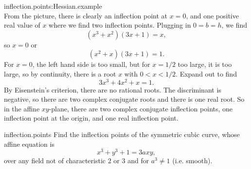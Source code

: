 \begin{answer}{inflection.points:Hessian.example}
\[\]
From the picture, there is clearly an inflection point at \(x=0\), and one positive real value of \(x\) where we find two inflection points.
Plugging in \(0=b=h\), we find 
\[
(x^3+x^2)(3x+1)=x,
\]
so \(x=0\) or 
\[
(x^2+x)(3x+1)=1.
\]
For \(x=0\), the left hand side is too small, but for \(x=1/2\) too large, it is too large, so by continuity, there is a root \(x\) with \(0<x<1/2\).
Expand out to find
\[
3x^3+4x^2+x=1.
\]
By Eisenstein's criterion, there are no rational roots.
The discriminant is negative, so there are two complex conjugate roots and there is one real root.
So in the affine \(xy\)-plane, there are two complex conjugate inflection points, one inflection point at the origin, and one real inflection point. 
\end{answer}
\begin{problem}{inflection.points}
Find the inflection points of the symmetric cubic curve, whose affine equation is
\[
x^3+y^3+1=3axy,
\]
over any field not of characteristic \(2\) or \(3\) and for \(a^3\ne 1\) (i.e. smooth).
\end{problem}
